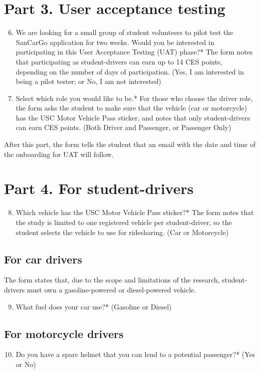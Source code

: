 \section*{Part 3. User acceptance testing}
\begin{enumerate}
    \setcounter{enumi}{5}
    \item We are looking for a small group of student volunteers to pilot test the SanCarGo application for two weeks. Would you be interested in participating in this User Acceptance Testing (UAT) phase?* The form notes that participating as student-drivers can earn up to 14 CES points, depending on the number of days of participation. (Yes, I am interested in being a pilot tester; or No, I am not interested)
    \item Select which role you would like to be.* For those who choose the driver role, the form asks the student to make sure that the vehicle (car or motorcycle) has the USC Motor Vehicle Pass sticker, and notes that only student-drivers can earn CES points. (Both Driver and Passenger, or Passenger Only)
\end{enumerate}
After this part, the form tells the student that an email with the date and time of the onboarding for UAT will follow.

\section*{Part 4. For student-drivers}
\begin{enumerate}
    \setcounter{enumi}{7}
    \item Which vehicle has the USC Motor Vehicle Pass sticker?* The form notes that the study is limited to one registered vehicle per student-driver, so the student selects the vehicle to use for ridesharing. (Car or Motorcycle)
\end{enumerate}

\subsection*{For car drivers}
The form states that, due to the scope and limitations of the research, student-drivers must own a gasoline-powered or diesel-powered vehicle.
\begin{enumerate}
    \setcounter{enumi}{8}
    \item What fuel does your car use?* (Gasoline or Diesel)
\end{enumerate}

\subsection*{For motorcycle drivers}
\begin{enumerate}
    \setcounter{enumi}{9}
    \item Do you have a spare helmet that you can lend to a potential passenger?* (Yes or No)
\end{enumerate}
